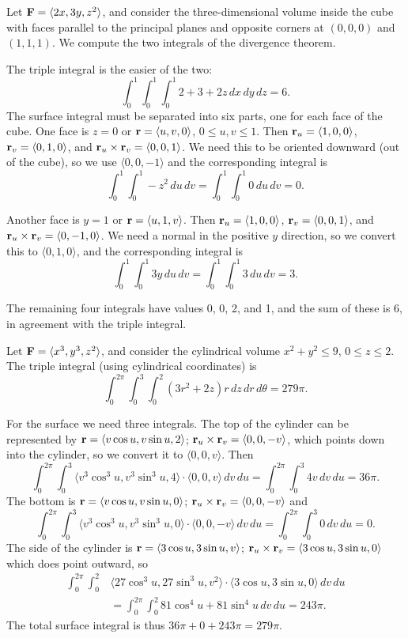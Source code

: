 \begin{example}{}{}
Let ${\bf F}=\langle 2x,3y,z^2\rangle$, and consider the
three-dimensional volume inside the cube with faces parallel to the
principal planes and opposite corners at
$(0,0,0)$ and $(1,1,1)$. We compute the two integrals of the
divergence theorem.

The triple integral is the easier of the two:
$$\int_0^1\int_0^1\int_0^1 2+3+2z\,dx\,dy\,dz=6.$$
The surface integral must be separated into six parts, one for each
face of the cube. One face is $z=0$ or ${\bf r}=\langle u,v,0\rangle$, $0\le
u,v\le 1$. Then ${\bf r}_u=\langle 1,0,0\rangle$, 
${\bf r}_v=\langle 0,1,0\rangle$, and ${\bf r}_u\times{\bf r}_v=
\langle 0,0,1\rangle$. We need this to be oriented downward (out of
the cube), so we use
$\langle 0,0,-1\rangle$ and the corresponding integral is
$$\int_0^1\int_0^1 -z^2\,du\,dv=\int_0^1\int_0^1 0\,du\,dv=0.$$

Another face is $y=1$ or ${\bf r}=\langle u,1,v\rangle$. Then ${\bf
  r}_u=\langle 1,0,0\rangle$, ${\bf r}_v=\langle 0,0,1\rangle$, and
${\bf r}_u\times{\bf r}_v= \langle 0,-1,0\rangle$. We need a normal in
the positive $y$ direction, so we convert this to $\langle
0,1,0\rangle$, and the corresponding integral is
$$\int_0^1\int_0^1 3y\,du\,dv=\int_0^1\int_0^1 3\,du\,dv=3.$$

The remaining four integrals have values 0, 0, 2, and 1, and the sum
of these is 6, in agreement with the triple integral.
\end{example}

\begin{example}{}{}
Let ${\bf F}=\langle x^3,y^3,z^2\rangle$, and consider the
cylindrical volume $x^2+y^2\le9$, $0\le z\le2$.
The triple integral (using cylindrical coordinates) is 
$$\int_0^{2\pi}\int_0^3\int_0^2 (3r^2+2z)r\,dz\,dr\,d\theta=279\pi.$$

For the surface we need three integrals. The top of the cylinder can
be represented by
${\bf r}=\langle v\cos u,v\sin u,2\rangle$; 
${\bf r}_u\times{\bf r}_v=\langle 0,0,-v\rangle$, which points down
into the cylinder,
so we convert it to $\langle 0,0,v\rangle$. Then
$$\int_0^{2\pi}\int_0^3 \langle v^3\cos^3u,v^3\sin^3u,4\rangle\cdot
\langle 0,0,v\rangle\,dv\,du=
\int_0^{2\pi}\int_0^3 4v\,dv\,du=36\pi.$$
The bottom is 
${\bf r}=\langle v\cos u,v\sin u,0\rangle$; 
${\bf r}_u\times{\bf r}_v=\langle 0,0,-v\rangle$ and
$$\int_0^{2\pi}\int_0^3 \langle v^3\cos^3u,v^3\sin^3u,0\rangle\cdot
\langle 0,0,-v\rangle\,dv\,du=
\int_0^{2\pi}\int_0^3 0\,dv\,du=0.$$
The side of the cylinder is ${\bf r}=\langle 3\cos u,3\sin u,v\rangle$;
${\bf r}_u\times{\bf r}_v=\langle 3\cos u,3\sin u,0\rangle$ which does
point outward, so
\begin{align*}
\int_0^{2\pi}\int_0^2 &\langle 27\cos^3 u,27\sin^3 u,v^2\rangle\cdot
\langle 3\cos u,3\sin u,0\rangle \,dv\,du	\\
&=\int_0^{2\pi}\int_0^2 81\cos^4 u+81\sin^4u\,dv\,du=243\pi.
\end{align*}
The total surface integral is thus $36\pi+0+243\pi=279\pi$.
\end{example}




